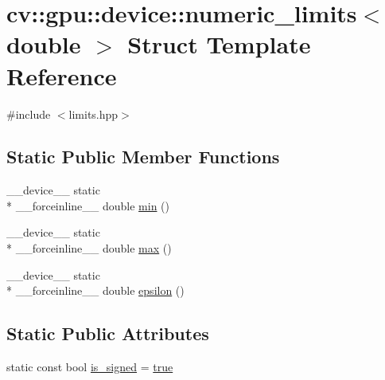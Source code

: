 \hypertarget{structcv_1_1gpu_1_1device_1_1numeric__limits_3_01double_01_4}{\section{cv\-:\-:gpu\-:\-:device\-:\-:numeric\-\_\-limits$<$ double $>$ Struct Template Reference}
\label{structcv_1_1gpu_1_1device_1_1numeric__limits_3_01double_01_4}
}


{\ttfamily \#include $<$limits.\-hpp$>$}

\subsection*{Static Public Member Functions}
\begin{DoxyCompactItemize}
\item 
\-\_\-\-\_\-device\-\_\-\-\_\- static \\*
\-\_\-\-\_\-forceinline\-\_\-\-\_\- double \hyperlink{structcv_1_1gpu_1_1device_1_1numeric__limits_3_01double_01_4_a2eaa795d9f9a80eadde0521a7a7a5b58}{min} ()
\item 
\-\_\-\-\_\-device\-\_\-\-\_\- static \\*
\-\_\-\-\_\-forceinline\-\_\-\-\_\- double \hyperlink{structcv_1_1gpu_1_1device_1_1numeric__limits_3_01double_01_4_a6ef492b185d94116c637ff70bd42c862}{max} ()
\item 
\-\_\-\-\_\-device\-\_\-\-\_\- static \\*
\-\_\-\-\_\-forceinline\-\_\-\-\_\- double \hyperlink{structcv_1_1gpu_1_1device_1_1numeric__limits_3_01double_01_4_aebefa4f2965f8e5901b968c20dac71c4}{epsilon} ()
\end{DoxyCompactItemize}
\subsection*{Static Public Attributes}
\begin{DoxyCompactItemize}
\item 
static const bool \hyperlink{structcv_1_1gpu_1_1device_1_1numeric__limits_3_01double_01_4_a7f4391b0ebd311635ea307cba49fbf0f}{is\-\_\-signed} = \hyperlink{namespacecv_1_1gpu_1_1device_ac34c172a7a1904fb0fd477321a31f926}{true}
\end{DoxyCompactItemize}


